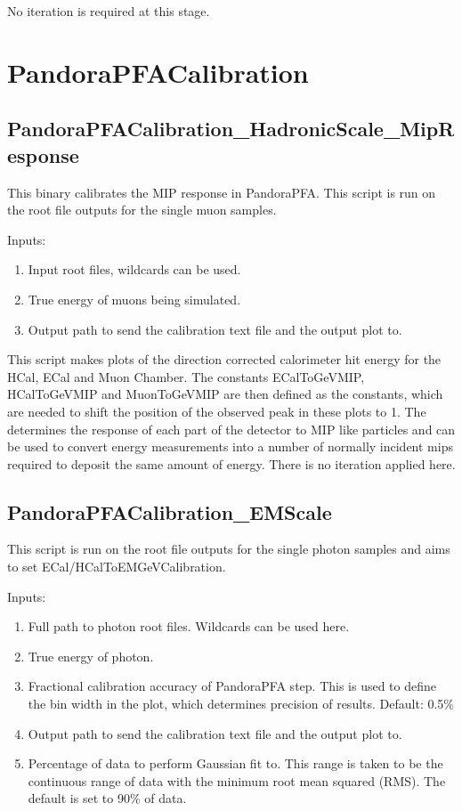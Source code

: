 \documentclass[11pt, oneside]{article}   	%
\begin{document}
No iteration is required at this stage.

\section{PandoraPFACalibration}

\subsection{PandoraPFACalibration\_HadronicScale\_MipResponse}

This binary calibrates the MIP response in PandoraPFA.  This script is run on the root file outputs for the single muon samples.

Inputs:
\begin{enumerate}
\item Input root files, wildcards can be used.
\item True energy of muons being simulated.
\item Output path to send the calibration text file and the output plot to.
\end{enumerate}

This script makes plots of the direction corrected calorimeter hit energy for the HCal, ECal and Muon Chamber.  The constants ECalToGeVMIP, HCalToGeVMIP and MuonToGeVMIP are then defined as the constants, which are needed to shift the position of the observed peak in these plots to 1.  The determines the response of each part of the detector to MIP like particles and can be used to convert energy measurements into a number of normally incident mips required to deposit the same amount of energy.  There is no iteration applied here.

\subsection{PandoraPFACalibration\_EMScale}

This script is run on the root file outputs for the single photon samples and aims to set ECal/HCalToEMGeVCalibration.

Inputs:
\begin{enumerate}
\item Full path to photon root files.  Wildcards can be used here.
\item True energy of photon.
\item Fractional calibration accuracy of PandoraPFA step.  This is used to define the bin width in the plot, which determines precision of results.  Default: 0.5\%
\item Output path to send the calibration text file and the output plot to.
\item Percentage of data to perform Gaussian fit to.  This range is taken to be the continuous range of data with the minimum root mean squared (RMS).  The default is set to 90\% of data.
\end{enumerate}
\end{document}
